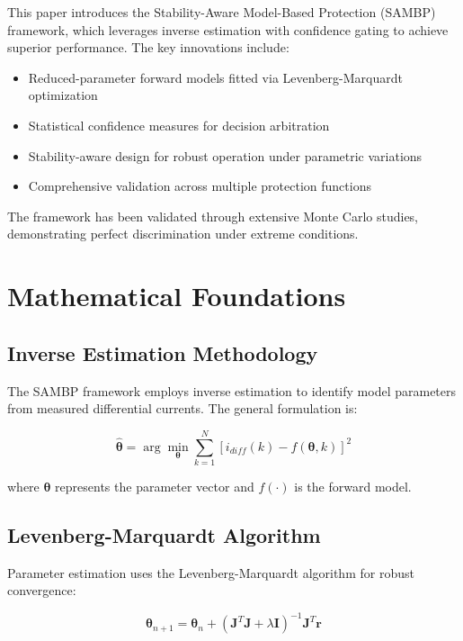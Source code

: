 \documentclass[10pt]{article}
\begin{document}
This paper introduces the Stability-Aware Model-Based Protection (SAMBP) framework, which leverages inverse estimation with confidence gating to achieve superior performance. The key innovations include:

\begin{itemize}
\item Reduced-parameter forward models fitted via Levenberg-Marquardt optimization
\item Statistical confidence measures for decision arbitration
\item Stability-aware design for robust operation under parametric variations
\item Comprehensive validation across multiple protection functions
\end{itemize}

The framework has been validated through extensive Monte Carlo studies, demonstrating perfect discrimination under extreme conditions.

\section{Mathematical Foundations}
\label{sec:foundations}

\subsection{Inverse Estimation Methodology}

The SAMBP framework employs inverse estimation to identify model parameters from measured differential currents. The general formulation is:

\begin{equation}
\hat{\boldsymbol{\theta}} = \arg\min_{\boldsymbol{\theta}} \sum_{k=1}^N \left[ i_{diff}(k) - f(\boldsymbol{\theta}, k) \right]^2
\label{eq:inverse}
\end{equation}

where $\boldsymbol{\theta}$ represents the parameter vector and $f(\cdot)$ is the forward model.

\subsection{Levenberg-Marquardt Algorithm}

Parameter estimation uses the Levenberg-Marquardt algorithm for robust convergence:

\begin{equation}
\boldsymbol{\theta}_{n+1} = \boldsymbol{\theta}_n + (\mathbf{J}^T\mathbf{J} + \lambda \mathbf{I})^{-1} \mathbf{J}^T \mathbf{r}
\label{eq:lm}
\end{equation}
\end{document}

